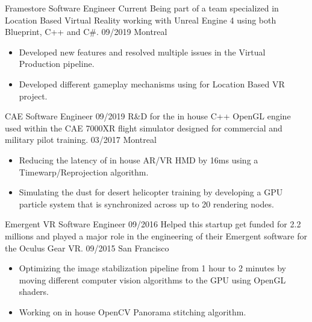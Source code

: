 %
%
%

\begin{experiences}
  \experience
    {Framestore}   			{Software Engineer}
    {Current} 			{Being part of a team specialized in Location Based Virtual Reality working with Unreal Engine 4 using both Blueprint, C++ and C\#.}
	{09/2019}	 	
	{Montreal}			{
						  \begin{itemize}
							\item Developed new features and resolved multiple issues in the Virtual Production pipeline.
							\item Developed different gameplay mechanisms using for Location Based VR project.
						  \end{itemize}
						 }
   \emptySeparator

  \experience
    {CAE}   				{Software Engineer}
    {09/2019} 			{R\&D for the in house C++ OpenGL engine used within the CAE 7000XR flight simulator designed for commercial and military pilot training.}
	{03/2017}	 	
	{Montreal}			{
						  \begin{itemize}
							\item Reducing the latency of in house AR/VR HMD by 16ms using a Timewarp/Reprojection algorithm.
							\item Simulating the dust for desert helicopter training by developing a GPU particle system that is synchronized across up to 20 rendering nodes.
						  \end{itemize}
						 }
   \emptySeparator
   
   \experience
    {Emergent VR} 			{Software Engineer}
    {09/2016} 				{Helped this startup get funded for 2.2 millions and played a major role in the engineering of their Emergent software for the Oculus Gear VR.}
	{09/2015}	 	
	{San Francisco}			{
						  \begin{itemize}
							\item Optimizing the image stabilization pipeline from 1 hour to 2 minutes by moving different computer vision algorithms to the GPU using OpenGL shaders.
							\item Working on in house OpenCV Panorama stitching algorithm.
						  \end{itemize}
						 }
   \emptySeparator
   

\end{experiences}
